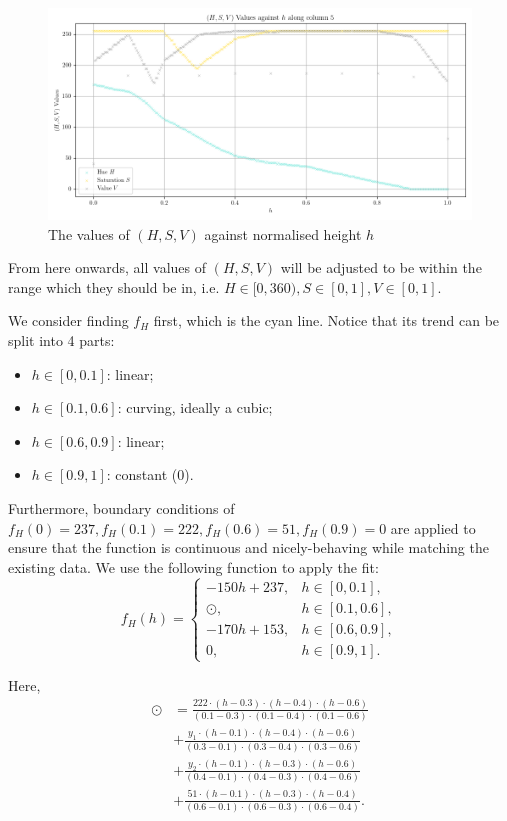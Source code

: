 \documentclass[10pt]{article}
\begin{document}
\begin{figure}[!ht]
    \centering
    \includegraphics[scale = 0.55]{hsv-against-h.png}
    \caption{The values of \((H, S, V)\) against normalised height \(h\)}
    \label{fig:hsv-against-h}
\end{figure}

From here onwards, all values of \((H, S, V)\) will be adjusted to be within the range which they should be in, i.e. \(H \in [0, 360), S \in [0, 1], V \in [0, 1]\).

We consider finding \(f_H\) first, which is the cyan line. Notice that its trend can be split into 4 parts:
\begin{itemize}
    \item \(h \in [0, 0.1]\): linear;
    \item \(h \in [0.1, 0.6]\): curving, ideally a cubic;
    \item \(h \in [0.6, 0.9]\): linear;
    \item \(h \in [0.9, 1]\): constant (0).
\end{itemize}

Furthermore, boundary conditions of \(f_H(0) = 237, f_H(0.1) = 222, f_H(0.6) = 51, f_H(0.9) = 0\) are applied to ensure that the function is continuous and nicely-behaving while matching the existing data. We use the following function to apply the fit:
\[
    f_H(h) = \begin{cases}
        -150h + 237, & h \in [0, 0.1],   \\
        \odot,       & h \in [0.1, 0.6], \\
        -170h + 153, & h \in [0.6, 0.9], \\
        0,           & h \in [0.9, 1].
    \end{cases}
\]

Here,
\begin{align*}
    \odot & = \frac{222 \cdot (h - 0.3) \cdot (h - 0.4) \cdot (h - 0.6)}{(0.1 - 0.3) \cdot (0.1 - 0.4) \cdot (0.1 - 0.6)} \\
          & + \frac{y_1 \cdot (h - 0.1) \cdot (h - 0.4) \cdot (h - 0.6)}{(0.3 - 0.1) \cdot (0.3 - 0.4) \cdot (0.3 - 0.6)} \\
          & + \frac{y_2 \cdot (h - 0.1) \cdot (h - 0.3) \cdot (h - 0.6)}{(0.4 - 0.1) \cdot (0.4 - 0.3) \cdot (0.4 - 0.6)} \\
          & + \frac{51 \cdot (h - 0.1) \cdot (h - 0.3) \cdot (h - 0.4)}{(0.6 - 0.1) \cdot (0.6 - 0.3) \cdot (0.6 - 0.4)}.
\end{align*}
\end{document}
